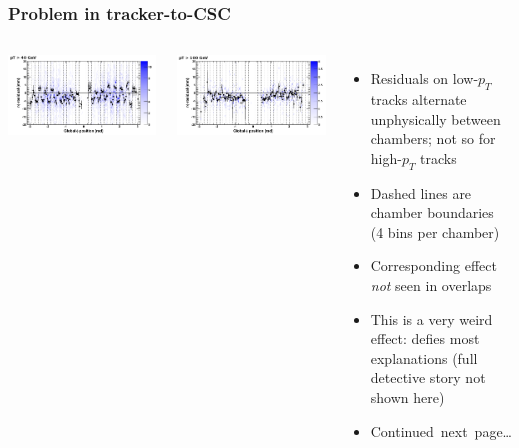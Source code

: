 \documentclass[compress]{beamer}
\begin{document}
\begin{frame}
\frametitle{Problem in tracker-to-CSC}

\begin{columns}
\includegraphics[width=\linewidth]{cscringproblem_40gev.png}

\includegraphics[width=\linewidth]{cscringproblem_100gev.png}

\begin{itemize}
\item Residuals on low-$p_T$ tracks alternate unphysically between chambers; not so for high-$p_T$ tracks

\item Dashed lines are chamber boundaries \\ (4 bins per chamber)

\item Corresponding effect {\it not} seen in overlaps

\item This is a very weird effect: defies most explanations (full detective story not shown here)

\item \mbox{Continued next page\ldots\hspace{-1 cm}}
\end{itemize}
\end{columns}
\end{frame}
\end{document}
